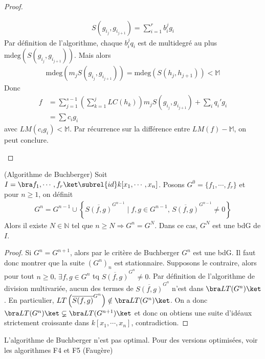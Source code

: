 \begin{proof}
\begin{enumerate}
                \begin{align*}
                    S(g_{i_j}, g_{i_{j+1}}) = \sum_{i = 1}^r b_i^jg_i
                \end{align*}
                Par définition de l'algorithme, chaque $b_i^jq_i$ est de multidegré au plus $\mathrm{mdeg}(S(g_{i_j}, g_{i_{j+1}}))$. Mais alors
                \begin{align*}
                    \mathrm{mdeg}(m_j S(g_{i_j}, g_{i_{j+1}})) = \mathrm{mdeg}(S(h_j,h_{j+1})) < \mathbb{M}
                \end{align*}
                Donc
                \begin{align*}
                    f &= \sum_{j = 1}^{s-1} \left(\sum_{k = 1}^j LC(h_k) \right) m_j S(g_{i_j},g_{i_{j+1}}) + \sum_i q_i'g_i \\        
                    &= \sum c_ig_i                
                \end{align*}
                avec $LM(c_ig_i) < \mathbb{M}$. Par récurrence sur la différence entre $LM(f) - \mathbb{M}$, on peut conclure.
            \end{enumerate}
        \end{proof}
        \begin{coro} (Algorithme de Buchberger)
            Soit $I = \bra f_1, \cdots, f_r \ket \subrel{id} k[x_1, \cdots, x_n]$. Posons $G^0 = \{f_1, \cdots, f_r\}$ et pour $n \geq 1$, on définit
            \begin{align*}
                G^n = G^{n-1} \cup \left\{\overline{S(f,g)}^{G^{n-1}} \mid f,g \in G^{n-1},\, \overline{S(f,g)}^{G^{n-1}} \neq 0\right\} 
            \end{align*}
            Alors il existe $N \in \mathbb{N}$ tel que $n \geq N \Rightarrow G^n = G^N$. Dans ce cas, $G^N$ est une bdG de $I$.
        \end{coro}
        \begin{proof}
            Si $G^n = G^{n+1}$, alors par le critère de Buchberger $G^n$ est une bdG. Il faut donc montrer que la suite $(G^n)_n$ est stationnaire. Supposons le contraire, alors pour tout $n \geq 0$, $\exists f,g \in G^n$ tq $\overline{S(f,g)}^{G^n} \neq 0$. Par définition de l'algorithme de division multivariée, aucun des termes de $\overline{S(f,g)}^{G^n}$ n'est dans $\bra LT(G^n) \ket$. En particulier, $LT \left(\overline{S(f,g)}^{G^n} \right) \notin \bra LT(G^n) \ket$. On a donc $\bra LT(G^n) \ket \varsubsetneq \bra LT(G^{n+1}) \ket$ et donc on obtiens une suite d'idéaux strictement croissante dans $k[x_1, \cdots, x_n]$, contradiction.
        \end{proof}
        \begin{remq}
            L'algorithme de Buchberger n'est pas optimal. Pour des versions optimisées, voir les algorithmes F4 et F5 (Faugère)
        \end{remq}

